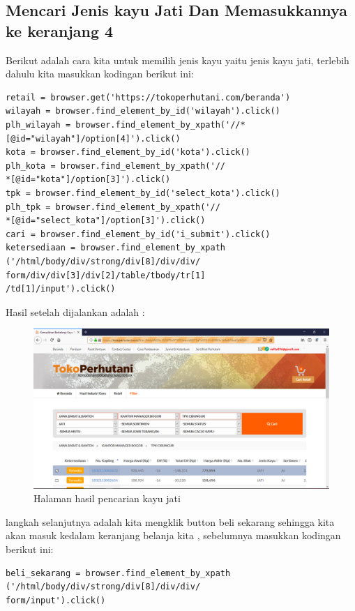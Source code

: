 \newpage 
\subsection{Mencari Jenis kayu Jati Dan Memasukkannya ke keranjang 4}
Berikut adalah cara kita untuk memilih jenis kayu yaitu jenis kayu jati, terlebih dahulu kita masukkan kodingan berikut ini: 
\begin{verbatim}
retail = browser.get('https://tokoperhutani.com/beranda')
wilayah = browser.find_element_by_id('wilayah').click()
plh_wilayah = browser.find_element_by_xpath('//*
[@id="wilayah"]/option[4]').click()
kota = browser.find_element_by_id('kota').click()
plh_kota = browser.find_element_by_xpath('//
*[@id="kota"]/option[3]').click()
tpk = browser.find_element_by_id('select_kota').click()
plh_tpk = browser.find_element_by_xpath('//
*[@id="select_kota"]/option[3]').click()
cari = browser.find_element_by_id('i_submit').click()
ketersediaan = browser.find_element_by_xpath
('/html/body/div/strong/div[8]/div/div/
form/div/div[3]/div[2]/table/tbody/tr[1]
/td[1]/input').click()
\end{verbatim}

Hasil setelah dijalankan adalah : 
\begin{figure}[h]
	\centering
	\includegraphics[scale=0.25]{figures/carikayu1}
	\caption{Halaman hasil pencarian kayu jati}
\end{figure}

\newpage
langkah selanjutnya adalah kita mengklik button beli sekarang sehingga kita akan masuk kedalam keranjang belanja kita , sebelumnya masukkan kodingan berikut ini: 
\begin{verbatim}
beli_sekarang = browser.find_element_by_xpath
('/html/body/div/strong/div[8]/div/div/
form/input').click()
\end{verbatim}

